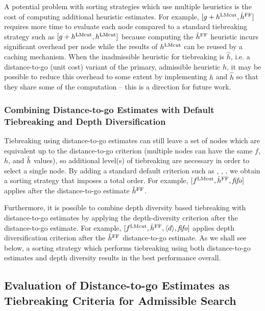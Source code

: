 A potential problem with sorting strategies which use multiple heuristics is the cost of computing additional
heuristic estimates. For example, $[g+h^{\text{LMcut}},\hat{h}^{\text{FF}}]$ requires more time to evaluate each node compared to a standard tiebreaking strategy such as $[g+h^{\text{LMcut}},h^{\text{LMcut}}]$ because computing the $\hat{h}^{\text{FF}}$ heuristic incurs significant overhead per node while the results of $h^{\text{LMcut}}$ can be reused by a caching mechanism.
When the inadmissible heuristic for tiebreaking is $\hat{h}$, i.e. a distance-to-go (unit cost) variant of the primary, admissible heuristic $h$, it may be possible to reduce this overhead to some extent by implementing $h$ and $\hat{h}$ so that they share some of the computation  -- this is a direction for future work.

\subsubsection{Combining Distance-to-go Estimates with Default Tiebreaking and Depth Diversification} %

Tiebreaking using distance-to-go estimates can still leave a set of nodes which are equivalent up to the distance-to-go criterion (multiple nodes can have the same $f$, $h$, and $\hat{h}$ values), so additional level(s) of tiebreaking are necessary in order to select a single node. By adding a standard default criterion such as \fifo, \lifo, \ro, we obtain a sorting strategy that imposes a total order. For example, 
$[f^{\text{LMcut}},\hat{h}^{\text{FF}},{\text{\textit{fifo}}}]$
 applies \fifo after the distance-to-go estimate $\hat{h}^{\text{FF}}$.

Furthermore, it is possible to combine depth diversity based tiebreaking with distance-to-go estimates by applying the depth-diversity criterion after the distance-to-go estimate. For example, 
$[f^{\text{LMcut}},\hat{h}^{\text{FF}},{\left<d\right>},{\text{\textit{fifo}}}]$ applies depth diversification criterion after the $\hat{h}^{\text{FF}}$ distance-to-go estimate.
As we shall see below, a sorting strategy which performs tiebreaking using both distance-to-go estimates and depth diversity results in the best performance overall.



\subsection{Evaluation of Distance-to-go Estimates as Tiebreaking Criteria for Admissible Search}

